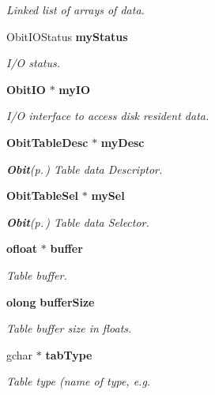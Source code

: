 \begin{CompactItemize}
\begin{CompactList}\small\item\em Linked list of arrays of data. \item\end{CompactList}\item 
Obit\-IOStatus {\bf my\-Status}
\begin{CompactList}\small\item\em I/O status. \item\end{CompactList}\item 
{\bf Obit\-IO} $\ast$ {\bf my\-IO}
\begin{CompactList}\small\item\em I/O interface to access disk resident data. \item\end{CompactList}\item 
{\bf Obit\-Table\-Desc} $\ast$ {\bf my\-Desc}
\begin{CompactList}\small\item\em {\bf Obit}{\rm (p.\,\pageref{structObit})} Table data Descriptor. \item\end{CompactList}\item 
{\bf Obit\-Table\-Sel} $\ast$ {\bf my\-Sel}
\begin{CompactList}\small\item\em {\bf Obit}{\rm (p.\,\pageref{structObit})} Table data Selector. \item\end{CompactList}\item 
{\bf ofloat} $\ast$ {\bf buffer}
\begin{CompactList}\small\item\em Table buffer. \item\end{CompactList}\item 
{\bf olong} {\bf buffer\-Size}
\begin{CompactList}\small\item\em Table buffer size in floats. \item\end{CompactList}\item 
gchar $\ast$ {\bf tab\-Type}
\begin{CompactList}\small\item\em Table type (name of type, e.g. \item\end{CompactList}\item 

\end{CompactItemize}
